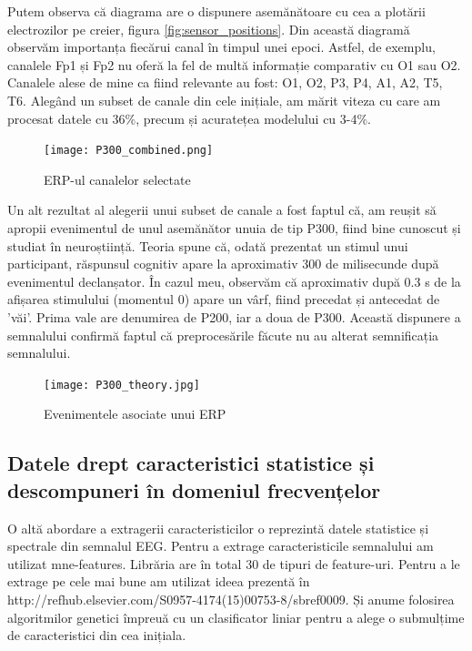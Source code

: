 Putem observa că diagrama are o dispunere asemănătoare cu cea a plotării electrozilor pe creier, figura \ref{fig:sensor_positions}. Din această diagramă observăm importanța fiecărui canal în timpul unei epoci. Astfel, de exemplu, canalele Fp1 și Fp2 nu oferă la fel de multă informație comparativ cu O1 sau O2. Canalele alese de mine ca fiind relevante au fost: O1, O2, P3, P4, A1, A2, T5, T6. Alegând un subset de canale din cele inițiale, am mărit viteza cu care am procesat datele cu 36\%, precum și acuratețea modelului cu 3-4\%.

\vspace{1em}
\begin{figure}[!h]
    \centering
    \texttt{[image: P300\_combined.png]}
    \caption{ERP-ul canalelor selectate}
    \label{fig:enter-label}
\end{figure}

Un alt rezultat al alegerii unui subset de canale a fost faptul că, am reușit să apropii evenimentul de unul asemănător unuia de tip P300\cite{P300}, fiind bine cunoscut și studiat în neuroștiință. Teoria spune că, odată prezentat un stimul unui participant, răspunsul cognitiv apare la aproximativ 300 de milisecunde după evenimentul declanșator. În cazul meu, observăm că aproximativ după 0.3 s de la afișarea stimulului (momentul 0) apare un vârf, fiind precedat și antecedat de 'văi'. Prima vale are denumirea de P200, iar a doua de P300. Această dispunere a semnalului confirmă faptul că preprocesările făcute nu au alterat semnificația semnalului. %

\vspace{1em}
\begin{figure}[h]
    \centering
    \texttt{[image: P300\_theory.jpg]}
    \caption{Evenimentele asociate unui ERP\cite{P300_image}}
    \label{fig:enter-label}
\end{figure}


\subsection{Datele drept caracteristici statistice și descompuneri în domeniul frecvențelor}

O altă abordare a extragerii caracteristicilor o reprezintă datele statistice și spectrale din semnalul EEG. Pentru a extrage caracteristicile semnalului am utilizat mne-features\cite{mne-features}. Librăria are în total 30 de tipuri de feature-uri. Pentru a le extrage pe cele mai bune am utilizat ideea prezentă în http://refhub.elsevier.com/S0957-4174(15)00753-8/sbref0009. Și anume folosirea algoritmilor genetici împreuă cu un clasificator liniar pentru a alege o submulțime de caracteristici din cea inițiala.

